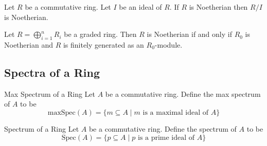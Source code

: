 \documentclass[a4paper]{article}
\begin{document}
\begin{prp}{}{} Let $R$ be a commutative ring. Let $I$ be an ideal of $R$. If $R$ is Noetherian then $R/I$ is Noetherian. 
\end{prp}

\begin{thm}{}{} Let $R=\bigoplus_{i=1}^nR_i$ be a graded ring. Then $R$ is Noetherian if and only if $R_0$ is Noetherian and $R$ is finitely generated as an $R_0$-module. 
\end{thm}

\subsection{Spectra of a Ring}
\begin{defn}{Max Spectrum of a Ring}{} Let $A$ be a commutative ring. Define the max spectrum of $A$ to be $$\text{maxSpec}(A)=\{m\subseteq A\;|\;m\text{ is a maximal ideal of }A\}$$
\end{defn}

\begin{defn}{Spectrum of a Ring}{} Let $A$ be a commutative ring. Define the spectrum of $A$ to be $$\text{Spec}(A)=\{p\subseteq A\;|\;p\text{ is a prime ideal of }A\}$$
\end{defn}
\end{document}

